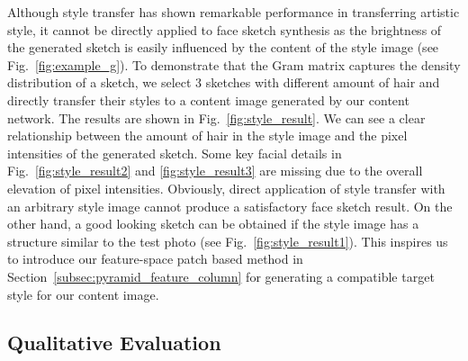\documentclass[10pt,twocolumn,letterpaper]{article}
\begin{document}
Although style transfer has shown remarkable performance in transferring artistic style, it cannot be directly applied to face sketch synthesis as the brightness of the generated sketch is easily influenced by the content of the style image (see Fig.~\ref{fig:example_g}). To demonstrate that the Gram matrix captures the density distribution of a sketch, we select 3 sketches with different amount of hair and directly transfer their styles to a content image generated by our content network. The results are shown in Fig.~\ref{fig:style_result}. We can see a clear relationship between the amount of hair in the style image and the pixel intensities of the generated sketch. Some key facial details in Fig.~\ref{fig:style_result2} and \ref{fig:style_result3} are missing due to the overall elevation of pixel intensities. Obviously, direct application of style transfer with an arbitrary style image cannot produce a satisfactory face sketch result. On the other hand, a good looking sketch can be obtained if the style image has a structure similar to the test photo (see Fig.~\ref{fig:style_result1}). This inspires us to introduce our feature-space patch based method in Section~\ref{subsec:pyramid_feature_column} for generating a compatible target style for our content image. 

\subsection{Qualitative Evaluation} \label{sec:sketch_gen}
\end{document}
